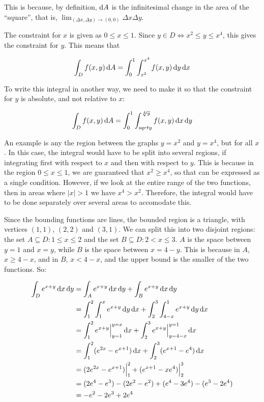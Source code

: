 This is because, by definition, $\mathop{}\!\mathrm{d} A$ is the infinitesimal change in the area of the ``square'', that is, $\lim_{(\Delta x, \Delta y) \rightarrow (0, 0)} \Delta x \Delta y$.


The constraint for $x$ is given as $0 \leq x \leq 1$. Since $y \in D \iff x^2 \leq y \leq x^4$, this gives the constraint for $y$. This means that

\begin{align*}
  \int_D f(x, y) \mathop{}\!\mathrm{d} A = \int_0^1 \int_{x^2}^{x^4} f(x, y) \mathop{}\!\mathrm{d} y \mathop{}\!\mathrm{d} x
\end{align*}

To write this integral in another way, we need to make it so that the constraint for $y$ is absolute, and not relative to $x$:

\begin{align*}
  \int_D f(x, y) \mathop{}\!\mathrm{d} A = \int_0^1 \int_{sqrt{y}}^{\sqrt[4]{y}} f(x, y) \mathop{}\!\mathrm{d} x \mathop{}\!\mathrm{d} y
\end{align*}

An example is any the region between the graphs $y = x^2$ and $y = x^4$, but for all $x$. In this case, the integral would have to be split into several regions, if integrating first with respect to $x$ and then with respect to $y$. This is because in the region $0 \leq x \leq 1$, we are guaranteed that $x^2 \geq x^4$, so that can be expressed as a single condition. However, if we look at the entire range of the two functions, then in areas where $|x| > 1$ we have $x^4 > x^2$. Therefore, the integral would have to be done separately over several areas to accomodate this.

Since the bounding functions are lines, the bounded region is a triangle, with vertices $(1, 1)$, $(2, 2)$ and $(3, 1)$. We can split this into two disjoint regions: the set $A \subseteq D: 1 \leq x \leq 2$ and the set $B \subseteq D: 2 < x \leq 3$. $A$ is the space between $y = 1$ and $x = y$, while $B$ is the space between $x = 4 - y$. This is because in $A$, $x \geq 4 - x$, and in $B$, $x < 4 - x$, and the upper bound is the smaller of the two functions. So:

\begin{align*}
  \int_D e^{x + y} \diff x \diff y &= \int_A e^{x + y} \diff x \diff y + \int_B e^{x + y} \diff x \diff y \\
  &= \int_1^2 \int_1^x e^{x + y} \diff y \diff x + \int_2^3 \int_{4 - x}^1 e^{x + y} \diff y \diff x \\
  &= \int_1^2 e^{x + y}\Big|_{y = 1}^{y = x} \diff x + \int_2^3 e^{x + y}\Big|_{y = 4 - x}^{y = 1} \diff x \\
  &= \int_1^2 (e^{2x} - e^{x + 1}) \diff x + \int_2^3 (e^{x + 1} - e^4) \diff x \\
  &= (2e^{2x} - e^{x + 1})\Big|_1^2 + (e^{x + 1} - xe^4)\Big|_2^3 \\
  &= (2e^4 - e^3) - (2e^2 - e^2) + (e^4 - 3e^4) - (e^3 - 2e^4) \\
  &= -e^2 - 2e^3 + 2e^4
\end{align*}

